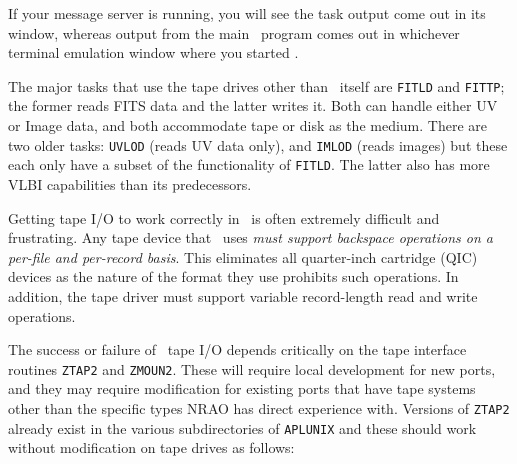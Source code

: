 If your message server is running, you will see the task output come out
in its window, whereas output from the main \ttaips\ program comes out
in whichever terminal emulation window where you started \ttaips.

\medskip{}

The major tasks that use the tape drives other than \ttaips\ itself are
{\tt FITLD} and {\tt FITTP}; the former reads FITS data and the latter
writes it.  Both can handle either UV or Image data, and both accommodate
tape or disk as the medium.  There are two older tasks: {\tt UVLOD} (reads
UV data only), and {\tt IMLOD} (reads images) but these each only have a
subset of the functionality of {\tt FITLD}.  The latter also has more VLBI
capabilities than its predecessors.

Getting tape I/O to work correctly in \AIPS\ is often extremely difficult
and frustrating.  Any tape device that \AIPS\ uses {\it must support
backspace operations on a per-file and per-record basis\/}.  This
eliminates all quarter-inch cartridge (QIC) devices as the nature of the
format they use prohibits such operations.  In addition, the tape driver
must support variable record-length read and write operations.

The success or failure of \AIPS\ tape I/O depends critically on the tape
interface routines {\tt ZTAP2} and {\tt ZMOUN2}.  These will require local
development for new ports, and they may require modification for existing
ports that have tape systems other than the specific types NRAO has direct
experience with.  Versions of {\tt ZTAP2} already exist in the various
subdirectories of {\tt\dol APLUNIX} and these should work without
modification on tape drives as follows:\medskip

